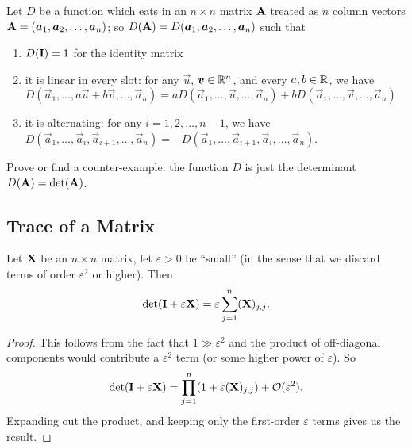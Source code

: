 \begin{exercise}
Let $D$ be a function which eats in an $n\times n$ matrix $\mathbf{A}$
treated as $n$ column vectors $\mathbf{A}=(\boldsymbol{a}_{1},\boldsymbol{a}_{2}, \dots,\boldsymbol{a}_{n})$;
so $D(\mathbf{A}) = D(\boldsymbol{a}_{1},\boldsymbol{a}_{2},\dots,\boldsymbol{a}_{n})$ such that
\begin{enumerate}
\item $D(\mathbf{I})=1$ for the identity matrix
\item it is linear in every slot: for any $\vec{u}$, $\boldsymbol{v}\in\mathbb{R}^{n}$,
  and every $a,b\in\mathbb{R}$, we have
  $D(\vec{a}_{1},\dots,a\vec{u}+b\vec{v},\dots,\vec{a}_{n})=aD(\vec{a}_{1},\dots,\vec{u},\dots,\vec{a}_{n}) + bD(\vec{a}_{1},\dots,\vec{v},\dots,\vec{a}_{n})$
\item it is alternating: for any $i=1,2,\dots,n-1$, we have
  $D(\vec{a}_{1},\dots,\vec{a}_{i},\vec{a}_{i+1},\dots,\vec{a}_{n})=-D(\vec{a}_{1},\dots,\vec{a}_{i+1},\vec{a}_{i},\dots,\vec{a}_{n})$.
\end{enumerate}
Prove or find a counter-example: the function $D$ is just the determinant $D(\mathbf{A})=\det(\mathbf{A})$.
\end{exercise}

\subsection{Trace of a Matrix}

\begin{proposition}
Let $\mathbf{X}$ be an $n\times n$ matrix, let $\varepsilon>0$ be ``small''
(in the sense that we discard terms of order $\varepsilon^{2}$ or higher).
Then
\begin{equation}
\det(\mathbf{I} + \varepsilon\mathbf{X}) = \varepsilon\sum^{n}_{j=1}(\mathbf{X})_{j,j}.
\end{equation}
\end{proposition}

\begin{proof}
This follows from the fact that $1\gg\varepsilon^{2}$ and the product of
off-diagonal components would contribute a $\varepsilon^{2}$ term (or
some higher power of $\varepsilon$). So
\begin{equation}
\det(\mathbf{I} + \varepsilon\mathbf{X}) = \prod^{n}_{j=1}(1 + \varepsilon(\mathbf{X})_{j,j})+\mathcal{O}(\varepsilon^{2}).
\end{equation}
Expanding out the product, and keeping only the first-order
$\varepsilon$ terms gives us the result.
\end{proof}

